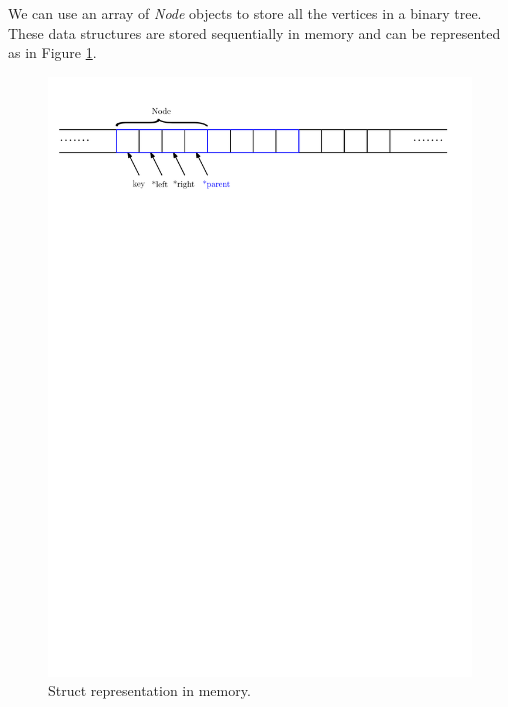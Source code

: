 \documentclass[11pt]{article}
\theoremstyle{definition}
\begin{document}
    We can use an array of \emph{Node} objects to store all the vertices in a binary tree. These data structures are stored sequentially in memory and can be represented as in Figure \ref{fig:structrepresentation}.
    \begin{figure}[tbh]
        \centering
        \includegraphics[scale=0.7]{figures/struct-representation.pdf}
        \caption{Struct representation in memory.}
        \label{fig:structrepresentation}
    \end{figure}
\end{document}
